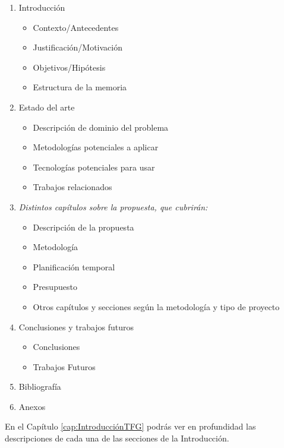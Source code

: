 \begin{enumerate}
    \item Introducción
        \begin{itemize}
            \item Contexto/Antecedentes
            \item Justificación/Motivación
            \item Objetivos/Hipótesis
            \item Estructura de la memoria
        \end{itemize}
    \item Estado del arte
        \begin{itemize}
            \item Descripción de dominio del problema
            \item Metodologías potenciales a aplicar
            \item Tecnologías potenciales para usar
            \item Trabajos relacionados
        \end{itemize}
    \item \textit{Distintos capítulos sobre la propuesta, que cubrirán:}
    \begin{itemize}
            \item Descripción de la propuesta
            \item Metodología
            \item Planificación temporal
            \item Presupuesto
            \item Otros capítulos y secciones según la metodología y tipo de proyecto
        \end{itemize}
    \item Conclusiones y trabajos futuros
    \begin{itemize}
            \item Conclusiones
            \item Trabajos Futuros
        \end{itemize}
    \item Bibliografía
    \item Anexos
\end{enumerate}

En el Capítulo \ref{cap:IntroducciónTFG} podrás ver en profundidad las descripciones de cada una de las secciones de la Introducción.


